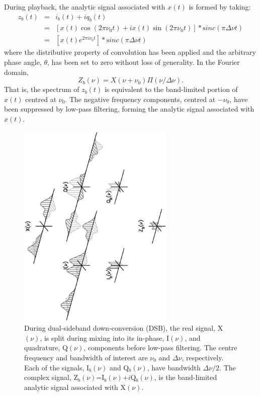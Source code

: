 \documentclass[twocolumn]{aastex6}
\newcommand{\Ci}{\ensuremath{i}}
\newcommand{\sinc}{\mathrm sinc}
\newcommand{\bw}{\ensuremath{ \Delta\nu }}
\begin{document}
\begin{appendix}
During playback, the analytic signal associated with $x(t)$ is formed
by taking:
\begin{eqnarray}
  z_b(t) & = & i_b(t)+\Ci q_b(t) \nonumber \\
       & = & [x(t)\cos(2\pi\nu_0 t)+\Ci x(t)\sin(2\pi\nu_0 t)] 
		* \sinc(\pi\Delta\nu t) \nonumber \\
       & = & [x(t)e^{2\pi\Ci\nu_0t}] * \sinc(\pi\Delta\nu t) \nonumber
\end{eqnarray}
where the distributive property of convolution has been applied and
the arbitrary phase angle, $\theta$, has been set to zero without loss
of generality.  In the Fourier domain,
\[
	Z_b(\nu)=X(\nu+\nu_0) \Pi(\nu/\Delta\nu).
\]
That is, the spectrum of $z_b(t)$ is equivalent to the band-limited
portion of $x(t)$ centred at $\nu_0$.  The negative frequency
components, centred at $-\nu_0$, have been suppressed by low-pass
filtering, forming the analytic signal associated with $x(t)$.

\begin{figure}[h]

\centerline{\includegraphics[height=10cm,angle=-90]{dsb.eps}}
\caption{During dual-sideband down-conversion (DSB), the real
signal, X$(\nu)$, is split during mixing into its in-phase, I$(\nu)$,
and quadrature, Q$(\nu)$, components before low-pass filtering.  The
centre frequency and bandwidth of interest are $\nu_0$ and
\bw, respectively.  Each of the signals, I$_b(\nu)$ and Q$_b(\nu)$, 
have bandwidth $\Delta\nu/2$.  The complex signal,
Z$_b(\nu)$=I$_b(\nu)$+\Ci Q$_b(\nu)$, is the band-limited analytic
signal associated with X$(\nu)$.}
\label{fig:dsb}
\end{figure}


\end{appendix}
\end{document}
